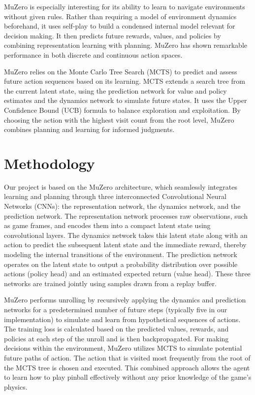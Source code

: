 \documentclass{article}
\begin{document}
MuZero is especially interesting for its ability to learn to navigate environments without given rules. Rather than requiring a model of environment dynamics beforehand, it uses self-play to build a condensed internal model relevant for decision making. It then predicts future rewards, values, and policies by combining representation learning with planning. MuZero has shown remarkable performance in both discrete and continuous action spaces.

MuZero relies on the Monte Carlo Tree Search (MCTS) to predict and assess future action sequences based on its learning. MCTS extends a search tree from the current latent state, using the prediction network for value and policy estimates and the dynamics network to simulate future states. It uses the Upper Confidence Bound (UCB) formula to balance exploration and exploitation. By choosing the action with the highest visit count from the root level, MuZero combines planning and learning for informed judgments.

\section{Methodology}
Our project is based on the MuZero architecture, which seamlessly integrates learning and planning through three interconnected Convolutional Neural Networks (CNNs): the representation network, the dynamics network, and the prediction network. The representation network processes raw observations, such as game frames, and encodes them into a compact latent state using convolutional layers. The dynamics network takes this latent state along with an action to predict the subsequent latent state and the immediate reward, thereby modeling the internal transitions of the environment. The prediction network operates on the latent state to output a probability distribution over possible actions (policy head) and an estimated expected return (value head). These three networks are trained jointly using samples drawn from a replay buffer.

MuZero performs unrolling by recursively applying the dynamics and prediction networks for a predetermined number of future steps (typically five in our implementation) to simulate and learn from hypothetical sequences of actions. The training loss is calculated based on the predicted values, rewards, and policies at each step of the unroll and is then backpropagated. For making decisions within the environment, MuZero utilizes MCTS to simulate potential future paths of action. The action that is visited most frequently from the root of the MCTS tree is chosen and executed. This combined approach allows the agent to learn how to play pinball effectively without any prior knowledge of the game's physics.
\end{document}
